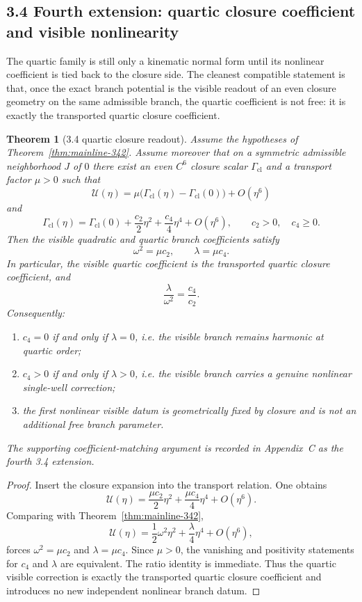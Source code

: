 \documentclass[12pt,a4paper]{article}
\newtheorem{theorem}{Theorem}[section]
\begin{document}
\subsection*{3.4 Fourth extension: quartic closure coefficient and visible nonlinearity}
The quartic family is still only a kinematic normal form until its nonlinear coefficient is tied back to the closure side. The cleanest compatible statement is that, once the exact branch potential is the visible readout of an even closure geometry on the same admissible branch, the quartic coefficient is not free: it is exactly the transported quartic closure coefficient.

\begin{theorem}[3.4 quartic closure readout]
\label{thm:mainline-343}
Assume the hypotheses of Theorem~\ref{thm:mainline-342}. Assume moreover that on a symmetric admissible neighborhood $J$ of $0$ there exist an even $C^6$ closure scalar $\Gamma_{\mathrm{cl}}$ and a transport factor $\mu>0$ such that
\[
 \mathcal U(\eta)=\mu\bigl(\Gamma_{\mathrm{cl}}(\eta)-\Gamma_{\mathrm{cl}}(0)\bigr)+O(\eta^6)
\]
and
\[
 \Gamma_{\mathrm{cl}}(\eta)
 =\Gamma_{\mathrm{cl}}(0)+\frac{c_2}{2}\eta^2+\frac{c_4}{4}\eta^4+O(\eta^6),
 \qquad c_2>0,\quad c_4\ge 0.
\]
Then the visible quadratic and quartic branch coefficients satisfy
\[
 \omega^2=\mu c_2,
 \qquad
 \lambda=\mu c_4.
\]
In particular, the visible quartic coefficient is the transported quartic closure coefficient, and
\[
 \frac{\lambda}{\omega^2}=\frac{c_4}{c_2}.
\]
Consequently:
\begin{enumerate}[label=(\roman*)]
 \item $c_4=0$ if and only if $\lambda=0$, i.e. the visible branch remains harmonic at quartic order;
 \item $c_4>0$ if and only if $\lambda>0$, i.e. the visible branch carries a genuine nonlinear single-well correction;
 \item the first nonlinear visible datum is geometrically fixed by closure and is not an additional free branch parameter.
\end{enumerate}
The supporting coefficient-matching argument is recorded in Appendix~C as the fourth 3.4 extension.
\end{theorem}

\begin{proof}
Insert the closure expansion into the transport relation. One obtains
\[
 \mathcal U(\eta)
 =\frac{\mu c_2}{2}\eta^2+\frac{\mu c_4}{4}\eta^4+O(\eta^6).
\]
Comparing with Theorem~\ref{thm:mainline-342},
\[
 \mathcal U(\eta)=\frac12\omega^2\eta^2+\frac{\lambda}{4}\eta^4+O(\eta^6),
\]
forces $\omega^2=\mu c_2$ and $\lambda=\mu c_4$. Since $\mu>0$, the vanishing and positivity statements for $c_4$ and $\lambda$ are equivalent. The ratio identity is immediate. Thus the quartic visible correction is exactly the transported quartic closure coefficient and introduces no new independent nonlinear branch datum.
\end{proof}
\end{document}

